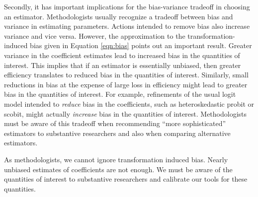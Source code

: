 \documentclass[12pt]{article}
\begin{document}
Secondly, it has important implications for the bias-variance tradeoff in choosing an estimator. 
Methodologists usually recognize a tradeoff between bias and variance in estimating parameters. 
Actions intended to remove bias also increase variance and vice versa.
However, the approximation to the transformation-induced bias given in Equation \ref{eqn:bias} points out an important result. 
Greater variance in the coefficient estimates lead to increased bias in the quantities of interest. 
This implies that if an estimator is essentially unbiased, then greater efficiency translates to reduced bias in the quantities of interest. 
Similarly, small reductions in bias at the expense of large loss in efficiency might lead to greater bias in the quantities of interest. 
For example, refinements of the usual logit model intended to \textit{reduce} bias in the coefficients, such as heteroskedastic probit or scobit, might actually \textit{increase} bias in the quantities of interest. 
Methodologists must be aware of this tradeoff when recommending ``more sophisticated'' estimators to substantive researchers and also when comparing alternative estimators.

As methodologists, we cannot ignore transformation induced bias. Nearly unbiased estimates of coefficients are not enough. We must be aware of the quantities of interest to substantive researchers and calibrate our tools for these quantities.

\singlespace 
\small


\end{document}
